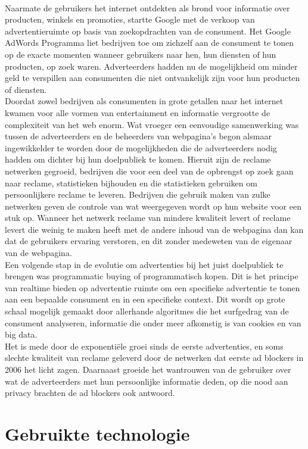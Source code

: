 \documentclass[pdftex,a4paper,12pt,twoside]{report}
\begin{document}
\\
Naarmate de gebruikers het internet ontdekten als brond voor informatie over producten, winkels en promoties, startte Google met de verkoop van advertentieruimte op basis van zoekopdrachten van de consument. Het Google AdWords Programma liet bedrijven toe om zichzelf aan de consument te tonen op de exacte momenten wanneer gebruikers naar hen, hun diensten of hun producten, op zoek waren. Adverteerders hadden nu de mogelijkheid om minder geld te verspillen aan consumenten die niet ontvankelijk zijn voor hun producten of diensten.
\\
Doordat zowel bedrijven als consumenten in grote getallen naar het internet kwamen voor alle vormen van entertainment en informatie vergrootte de complexiteit van het web enorm. Wat vroeger een eenvoudige samenwerking was tussen de adverteerders en de beheerders van webpagina’s begon alsmaar ingewikkelder te worden door de mogelijkheden die de adverteerders nodig hadden om dichter bij hun doelpubliek te komen. Hieruit zijn de reclame netwerken gegroeid, bedrijven die voor een deel van de opbrengst op zoek gaan naar reclame, statistieken bijhouden en die statistieken gebruiken om persoonlijkere reclame te leveren. Bedrijven die gebruik maken van zulke netwerken geven de controle van wat weergegeven wordt op hun website voor een stuk op. Wanneer het netwerk reclame van mindere kwaliteit levert of reclame levert die weinig te maken heeft met de andere inhoud van de webpagina dan kan dat de gebruikers ervaring verstoren, en dit zonder medeweten van de eigenaar van de webpagina.
\\
Een volgende stap in de evolutie om advertenties bij het juist doelpubliek te brengen was programmatic buying of programmatisch kopen. Dit is het principe van realtime bieden op advertentie ruimte om een specifieke advertentie te tonen aan een bepaalde consument en in een specifieke context. Dit wordt op grote schaal mogelijk gemaakt door allerhande algoritmes die het surfgedrag van de consument analyseren, informatie die onder meer afkomstig is van cookies en van big data.
\\
Het is mede door de exponentiële groei sinds de eerste advertenties, en soms slechte kwaliteit van reclame geleverd door de netwerken dat eerste ad blockers in 2006 het licht zagen. Daarnaast groeide het wantrouwen van de gebruiker over wat de adverteerders met hun persoonlijke informatie deden, op die nood aan privacy brachten de ad blockers ook antwoord.

\section{Gebruikte technologie}
\label{sec:Gebruikte technologie}
\end{document}
